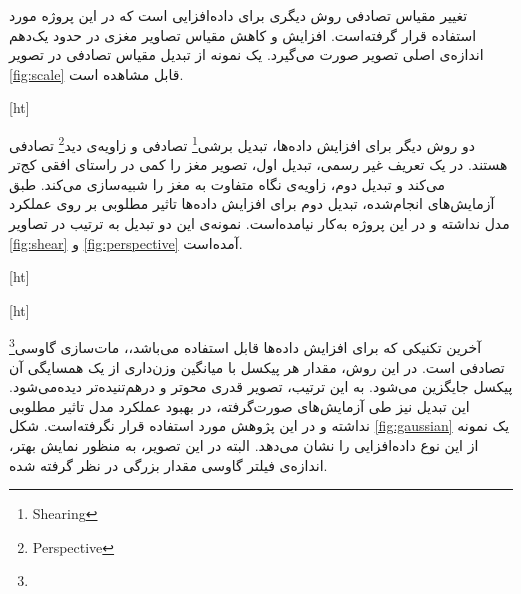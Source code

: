 تغییر مقیاس تصادفی روش دیگری برای داده‌افزایی است که در این پروژه مورد استفاده قرار گرفته‌است.
افزایش و کاهش مقیاس تصاویر مغزی در حدود یک‌دهم اندازه‌ی اصلی تصویر صورت می‌گیرد.
یک نمونه از تبدیل مقیاس تصادفی در تصویر 
\ref{fig:scale} قابل مشاهده است.

[ht]

دو روش دیگر برای افزایش داده‌ها،
 تبدیل برشی\footnote{Shearing}
تصادفی و 
زاویه‌ی دید\footnote{Perspective}
تصادفی هستند.
در یک تعریف غیر رسمی، تبدیل اول، تصویر مغز را کمی در راستای افقی کج‌تر می‌کند و تبدیل دوم، زاویه‌ی نگاه متفاوت به مغز را شبیه‌سازی می‌کند.
طبق آزمایش‌های انجام‌شده، تبدیل دوم برای افزایش داده‌ها تاثیر مطلوبی بر روی عملکرد مدل نداشته و در این پروژه به‌کار نیامده‌است.
نمونه‌ی این دو تبدیل به ترتیب در تصاویر \ref{fig:shear} و \ref{fig:perspective} آمده‌است.


[ht]



[ht]

آخرین تکنیکی که برای افزایش داده‌ها قابل استفاده می‌باشد،، 
مات‌سازی گاوسی\footnote{}
تصادفی است.
در این روش، مقدار هر پیکسل با میانگین وزن‌داری از یک همسایگی آن پیکسل جایگزین می‌شود.
به این ترتیب، تصویر قدری محو‌تر و درهم‌تنیده‌تر دیده‌می‌شود.
این تبدیل نیز طی آزمایش‌های صورت‌گرفته، در بهبود عملکرد مدل تاثیر مطلوبی نداشته و در این پژوهش مورد استفاده قرار نگرفته‌است.
شکل \ref{fig:gaussian} یک نمونه از این نوع داده‌افزایی را نشان می‌دهد.
البته در این تصویر، به منظور نمایش بهتر، اندازه‌ی فیلتر گاوسی مقدار بزرگی در نظر گرفته شده.

